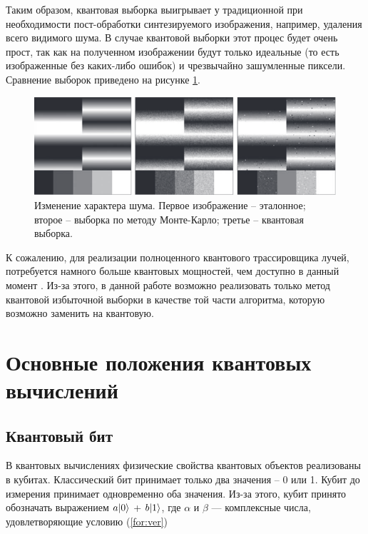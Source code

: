  Таким образом, квантовая выборка выигрывает у традиционной при необходимости пост-обработки синтезируемого изображения, например, удаления всего видимого шума. В случае квантовой выборки этот процес будет очень прост, так как на полученном изображении будут только идеальные (то есть изображенные без каких-либо ошибок) и чрезвычайно зашумленные пиксели. Сравнение выборок приведено на рисунке \ref{img:compare}.
 
\begin{figure}[H]
 	\begin{center}
 		\includegraphics[scale=0.7]{img/compare.png}
 	\end{center}
 	\captionsetup{justification=centering}
 	\caption{Изменение характера шума. Первое изображение -- эталонное; второе -- выборка по методу Монте-Карло; третье -- квантовая выборка.}
 	\label{img:compare}
\end{figure}

К сожалению, для реализации полноценного квантового трассировщика лучей, потребуется намного больше квантовых мощностей, чем доступно в данный момент \cite{PQC}. Из-за этого, в данной работе возможно реализовать только метод квантовой избыточной выборки в качестве той части алгоритма, которую возможно заменить на квантовую.

\section{Основные положения квантовых вычислений}

\subsection{Квантовый бит}

В квантовых вычислениях физические свойства квантовых объектов реализованы в кубитах. Классический бит принимает только два значения – 0 или 1. Кубит до измерения принимает одновременно оба значения. Из-за этого, кубит принято обозначать выражением $a\lvert0\rangle$ + $b\lvert1\rangle$, где $\alpha$ и $\beta$ — комплексные числа, удовлетворяющие условию (\ref{for:ver})

